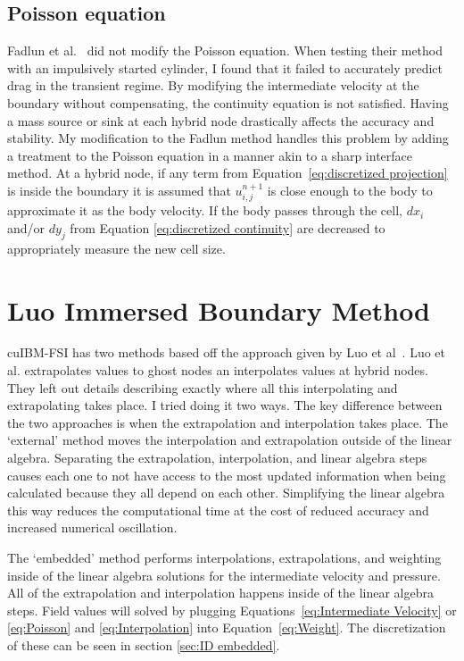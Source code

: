 \subsection{Poisson equation}
\label{sec:ID fadlun poisson}
Fadlun et al.~\cite{Fadlun:2000fl} did not modify the Poisson equation. 
When testing their method with an impulsively started cylinder, I found that it failed to accurately predict drag in the transient regime. 
By modifying the intermediate velocity at the boundary without compensating, the continuity equation is not satisfied. 
Having a mass source or sink at each hybrid node drastically affects the accuracy and stability. 
My modification to the Fadlun method handles this problem by adding a treatment to the Poisson equation in a manner akin to a sharp interface method. 
At a hybrid node, if any term from Equation~\eqref{eq:discretized projection} is inside the boundary it is assumed that $u_{i,j}^{n+1}$ is close enough to the body to approximate it as the body velocity. 
If the body passes through the cell, $dx_i$ and/or $dy_j$ from Equation \eqref{eq:discretized continuity} are decreased to appropriately measure the new cell size. 

\section{Luo Immersed Boundary Method}
\label{sec:ID luo}
cuIBM-FSI has two methods based off the approach given by Luo et al~\cite{Luo:2012gx}. 
Luo et al. extrapolates values to ghost nodes an interpolates values at hybrid nodes.
They left out details describing exactly where all this interpolating and extrapolating takes place. 
I tried doing it two ways. 
The key difference between the two approaches is when the extrapolation and interpolation takes place. 
The `external' method moves the interpolation and extrapolation outside of the linear algebra. 
Separating the extrapolation, interpolation, and linear algebra steps causes each one to not have access to the most updated information when being calculated because they all depend on each other. 
Simplifying the linear algebra this way reduces the computational time at the cost of reduced accuracy and increased numerical oscillation. 

The `embedded' method performs  interpolations, extrapolations, and weighting inside of the linear algebra solutions for the intermediate velocity and pressure. 
All of the extrapolation and interpolation happens inside of the linear algebra steps.
Field values will solved by plugging Equations~\eqref{eq:Intermediate Velocity} or \eqref{eq:Poisson} and \eqref{eq:Interpolation} into Equation~\eqref{eq:Weight}. 
The discretization of these can be seen in section \ref{sec:ID embedded}. 

